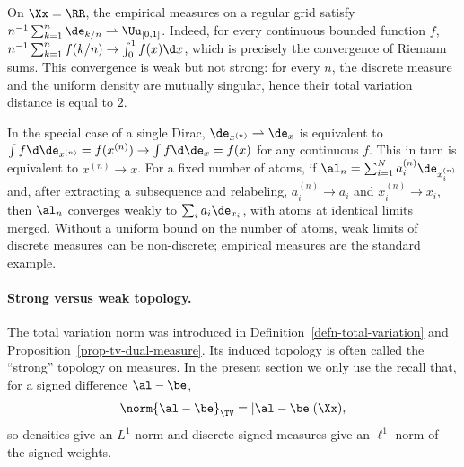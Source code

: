 \begin{rem}\label{rem-riemann-weak-limit}
	On $\Xx=\RR$, the empirical measures on a regular grid satisfy
	$n^{-1}\sum_{k=1}^n\de_{k/n}\rightharpoonup\Uu_{[0,1]}$.
	Indeed, for every continuous bounded function $f$,
	$n^{-1}\sum_{k=1}^nf(k/n)\to\int_0^1f(x)\d x$,
	which is precisely the convergence of Riemann sums. This convergence is weak but not strong: for every $n$, the discrete measure and the uniform density are mutually singular, hence their total variation distance is equal to $2$.
\end{rem}

\begin{rem}\label{rem-weak-conv-disc}
	In the special case of a single Dirac, $\de_{x^{(n)}} \rightharpoonup \de_x$ is equivalent to $\int f \d\de_{x^{(n)}} = f(x^{(n)}) \rightarrow \int f \d\de_{x} = f(x)$ for any continuous $f$. This in turn is equivalent to $x^{(n)} \rightarrow x$.
	For a fixed number of atoms, if $\al_n=\sum_{i=1}^N a_i^{(n)}\de_{x_i^{(n)}}$ and, after extracting a subsequence and relabeling, $a_i^{(n)}\to a_i$ and $x_i^{(n)}\to x_i$, then $\al_n$ converges weakly to $\sum_i a_i\de_{x_i}$, with atoms at identical limits merged. Without a uniform bound on the number of atoms, weak limits of discrete measures can be non-discrete; empirical measures are the standard example.
\end{rem}

\paragraph{Strong versus weak topology.}
The total variation norm was introduced in Definition~\ref{defn-total-variation} and Proposition~\ref{prop-tv-dual-measure}. Its induced topology is often called the ``strong'' topology on measures. In the present section we only use the recall that, for a signed difference $\al-\be$,
\[
	\norm{\al-\be}_{\TV}=|\al-\be|(\Xx),
\]
so densities give an $L^1$ norm and discrete signed measures give an $\ell^1$ norm of the signed weights.

